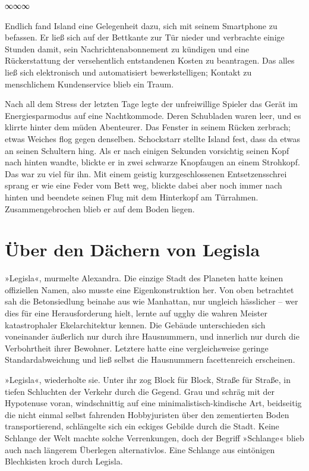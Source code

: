 \begin{center}
∞∞∞
\end{center}

Endlich fand Island eine Gelegenheit dazu, sich mit seinem Smartphone zu befassen. Er ließ sich auf der Bettkante zur Tür nieder und verbrachte einige Stunden damit, sein Nachrichtenabonnement zu kündigen und eine Rückerstattung der versehentlich entstandenen Kosten zu beantragen. Das alles ließ sich elektronisch und automatisiert bewerkstelligen; Kontakt zu menschlichem Kundenservice blieb ein Traum.

Nach all dem Stress der letzten Tage legte der unfreiwillige Spieler das Gerät im Energiesparmodus auf eine Nachtkommode. Deren Schubladen waren leer, und es klirrte hinter dem müden Abenteurer. Das Fenster in seinem Rücken zerbrach; etwas Weiches flog gegen denselben. Schockstarr stellte Island fest, dass da etwas an seinen Schultern hing. Als er nach einigen Sekunden vorsichtig seinen Kopf nach hinten wandte, blickte er in zwei schwarze Knopfaugen an einem Strohkopf. Das war zu viel für ihn. Mit einem geistig kurzgeschlossenen Entsetzensschrei sprang er wie eine Feder vom Bett weg, blickte dabei aber noch immer nach hinten und beendete seinen Flug mit dem Hinterkopf am Türrahmen. Zusammengebrochen blieb er auf dem Boden liegen.


\chapter{Über den Dächern von Legisla}

»Legisla«, murmelte Alexandra. Die einzige Stadt des Planeten hatte keinen offiziellen Namen, also musste eine Eigenkonstruktion her. Von oben betrachtet sah die Betonsiedlung beinahe aus wie Manhattan, nur ungleich hässlicher – wer dies für eine Herausforderung hielt, lernte auf ugghy die wahren Meister katastrophaler Ekelarchitektur kennen. Die Gebäude unterschieden sich voneinander äußerlich nur durch ihre Hausnummern, und innerlich nur durch die Verbohrtheit ihrer Bewohner. Letztere hatte eine vergleichsweise geringe Standardabweichung und ließ selbst die Hausnummern facettenreich erscheinen.

»Legisla«, wiederholte sie. Unter ihr zog Block für Block, Straße für Straße, in tiefen Schluchten der Verkehr durch die Gegend. Grau und schräg mit der Hypotenuse voran, windschnittig auf eine minimalistisch-kindische Art, beidseitig die nicht einmal selbst fahrenden Hobbyjuristen über den zementierten Boden transportierend, schlängelte sich ein eckiges Gebilde durch die Stadt. Keine Schlange der Welt machte solche Verrenkungen, doch der Begriff »Schlange« blieb auch nach längerem Überlegen alternativlos. Eine Schlange aus eintönigen Blechkisten kroch durch Legisla.


